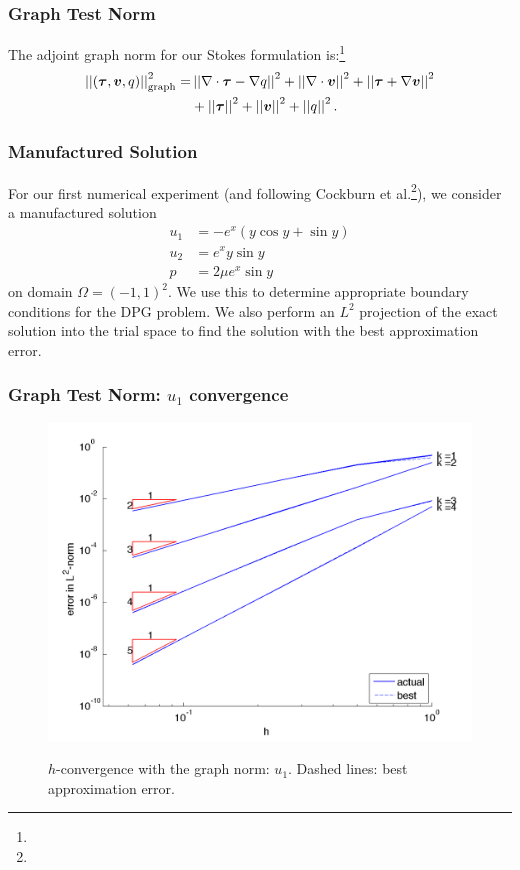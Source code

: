 \documentclass[mathserif]{beamer}
\newcommand{\NVRvect}[1]{\ensuremath\boldsymbol{#1}}
\newcommand{\vect}[1]{\ensuremath\boldsymbol{#1}}
\newcommand{\NVRtensor}[1]{\NVRvect{#1}}
\newcommand{\norm}[1]{\left|\left|#1\right|\right|}
\newcommand{\NVRgrad}{\nabla}
\newcommand{\NVRdiv}{\NVRgrad \cdot}
\newcommand{\FootSize}{\scriptsize}
\begin{document}
\begin{frame}
\frametitle{Graph Test Norm}
The adjoint graph norm for our Stokes formulation is:\footnote{\FootSize {}}
\begin{align*}
\norm{(\NVRtensor{\tau},\vect{v}, q)}_{\rm graph}^{2} =& \norm{\NVRdiv \NVRtensor{\tau} - \NVRgrad q}^{2} + \norm{\NVRdiv \vect{v}}^{2} + \norm{ \NVRtensor{\tau} + \NVRgrad{\vect{v}}}^{2}\\ 
&+ \norm{\NVRtensor{\tau}}^{2} + \norm{\vect{v}}^{2} + \norm{q}^{2}.
\end{align*}

\end{frame}

\begin{frame}
\frametitle{Manufactured Solution}
For our first numerical experiment (and following Cockburn et al.\footnote{\FootSize {}}), we consider a manufactured solution
\begin{align*}
u_{1} &=  -e^{x} ( y \cos y + \sin y )\\
u_{2} &=  e^{x}  y \sin y\\
p &= 2 \mu e^{x} \sin y
\end{align*}
on domain $\Omega=(-1,1)^{2}$.  We use this to determine appropriate boundary conditions for the DPG problem.  We also perform an $L^{2}$ projection of the exact solution into the trial space to find the solution with the best approximation error.
\end{frame}

\begin{frame}
\frametitle{Graph Test Norm: $u_{1}$ convergence}
\begin{figure}[!htb]
\center
{\setlength{\fboxsep}{1pt}\colorbox{pecos2}{\includegraphics[scale=.38]{../figures/u1_graph_h.png}}}
\caption{$h$-convergence with the graph norm: $u_{1}$.  Dashed lines: best approximation error.}
\end{figure}
\end{frame}
\end{document}

